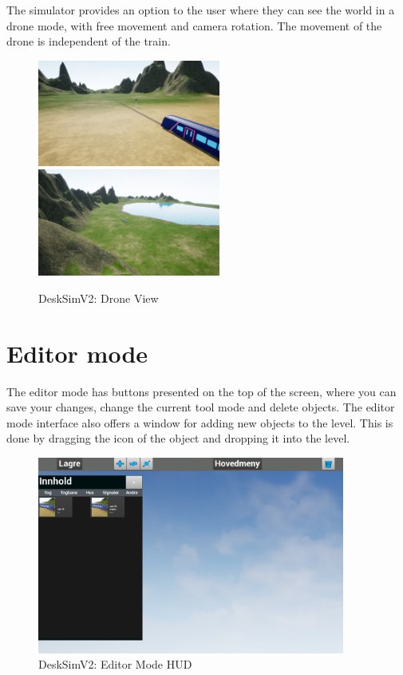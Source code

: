 The simulator provides an option to the user where they can see the world in a drone mode, with free movement and camera rotation. The movement of the drone is independent of the train. 

\begin{figure}[H]
    \centering

    \includegraphics[width=6cm]{figures/DroneMode.PNG}
    \includegraphics[width=6cm]{figures/DroneMode2.PNG}
    \caption{DeskSimV2: Drone View}
    \label{Drone_Mode_img}
\end{figure} 

\section{Editor mode}

The editor mode has buttons presented on the top of the screen, where you can save your changes, change the current tool mode and delete objects. The editor mode interface also offers a window for adding new objects to the level. This is done by dragging the icon of the object and dropping it into the level.

\begin{figure}[H]
    \centering

    \includegraphics[width=0.9\textwidth]{figures/HUD1.png}
    \caption{DeskSimV2: Editor Mode HUD}
    \label{Editor_Mode_img}
\end{figure} 